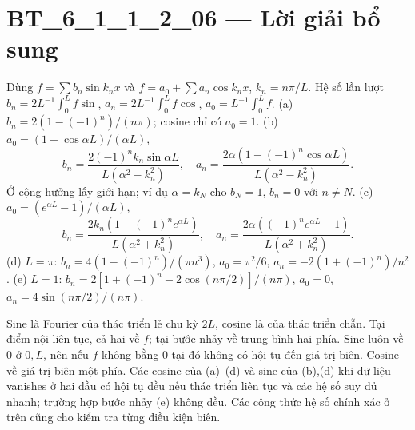 \documentclass[10pt,a4paper]{article}
\begin{document}
\section*{BT\_6\_1\_1\_2\_06 — Lời giải bổ sung}
Dùng $f=\sum b_n\sin k_nx$ và $f=a_0+\sum a_n\cos k_nx$, $k_n=n\pi/L$. Hệ số lần lượt $b_n=2L^{-1}\int_0^Lf\sin$, $a_n=2L^{-1}\int_0^Lf\cos$, $a_0=L^{-1}\int_0^Lf$.
(a) $b_n=2(1-(-1)^n)/(n\pi)$; cosine chỉ có $a_0=1$.
(b) $a_0=(1-\cos\alpha L)/(\alpha L)$,
\[b_n=\frac{2(-1)^nk_n\sin\alpha L}{L(\alpha^2-k_n^2)},\quad a_n=\frac{2\alpha(1-(-1)^n\cos\alpha L)}{L(\alpha^2-k_n^2)}.\]
Ở cộng hưởng lấy giới hạn; ví dụ $\alpha=k_N$ cho $b_N=1$, $b_n=0$ với $n\ne N$.
(c) $a_0=(e^{\alpha L}-1)/(\alpha L)$,
\[b_n=\frac{2k_n(1-(-1)^ne^{\alpha L})}{L(\alpha^2+k_n^2)},\quad a_n=\frac{2\alpha((-1)^ne^{\alpha L}-1)}{L(\alpha^2+k_n^2)}.\]
(d) $L=\pi$: $b_n=4(1-(-1)^n)/(\pi n^3)$, $a_0=\pi^2/6$, $a_n=-2(1+(-1)^n)/n^2$.
(e) $L=1$: $b_n=2[1+(-1)^n-2\cos(n\pi/2)]/(n\pi)$, $a_0=0$, $a_n=4\sin(n\pi/2)/(n\pi)$.

Sine là Fourier của thác triển lẻ chu kỳ $2L$, cosine là của thác triển chẵn. Tại điểm nội liên tục, cả hai về $f$; tại bước nhảy về trung bình hai phía. Sine luôn về 0 ở $0,L$, nên nếu $f$ không bằng 0 tại đó không có hội tụ đến giá trị biên. Cosine về giá trị biên một phía. Các cosine của (a)--(d) và sine của (b),(d) khi dữ liệu vanishes ở hai đầu có hội tụ đều nếu thác triển liên tục và các hệ số suy đủ nhanh; trường hợp bước nhảy (e) không đều. Các công thức hệ số chính xác ở trên cũng cho kiểm tra từng điều kiện biên.
\end{document}
